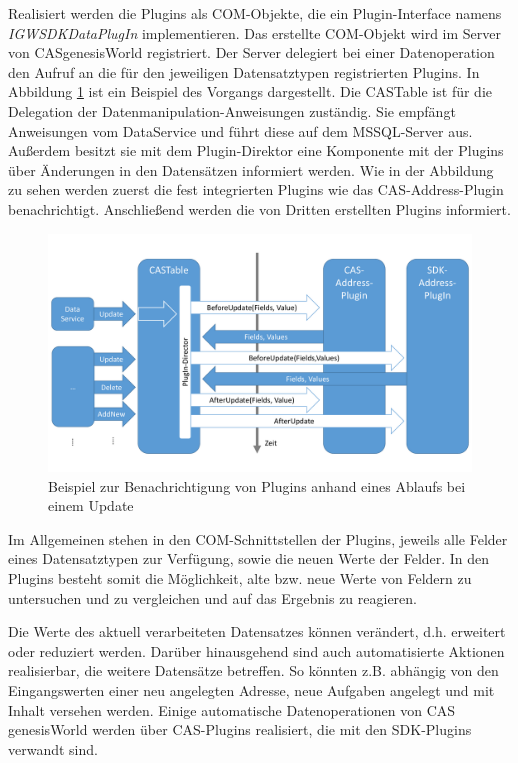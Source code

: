 Realisiert werden die Plugins als COM-Objekte, die ein Plugin-Interface namens \textit{IGWSDKDataPlugIn} implementieren. Das erstellte COM-Objekt wird im Server von CASgenesisWorld registriert. Der Server delegiert bei einer Datenoperation den Aufruf an die für den jeweiligen Datensatztypen registrierten Plugins. In Abbildung \ref{gw_plugin} ist ein Beispiel des Vorgangs dargestellt. Die CASTable ist für die Delegation der Datenmanipulation-Anweisungen zuständig. Sie empfängt Anweisungen vom DataService und führt diese auf dem MSSQL-Server aus. Außerdem besitzt sie mit dem Plugin-Direktor eine Komponente mit der Plugins über Änderungen in den Datensätzen informiert werden. Wie in der Abbildung zu sehen werden zuerst die fest integrierten Plugins wie das CAS-Address-Plugin benachrichtigt. Anschließend werden die von Dritten erstellten Plugins informiert.

\begin{figure}[H]
	\centering
  \includegraphics[width=1.0\textwidth, width=1.0\textwidth]{pics/analyse_plugins.pdf}
	\caption{Beispiel zur Benachrichtigung von Plugins anhand eines Ablaufs bei einem Update}
	\label{gw_plugin}
\end{figure}

Im Allgemeinen stehen in den COM-Schnittstellen der Plugins, jeweils alle Felder eines Datensatztypen zur Verfügung, sowie die neuen Werte der Felder. In den Plugins besteht somit die Möglichkeit, alte bzw. neue Werte von Feldern zu untersuchen und zu vergleichen und auf das Ergebnis zu reagieren.

Die Werte des aktuell verarbeiteten Datensatzes können verändert, d.h. erweitert oder reduziert werden. Darüber hinausgehend sind auch automatisierte Aktionen realisierbar, die weitere Datensätze betreffen. So könnten z.B. abhängig von den Eingangswerten einer neu angelegten Adresse, neue Aufgaben angelegt und mit Inhalt versehen werden. Einige automatische Datenoperationen von CAS genesisWorld werden über CAS-Plugins realisiert, die mit den SDK-Plugins verwandt sind.

